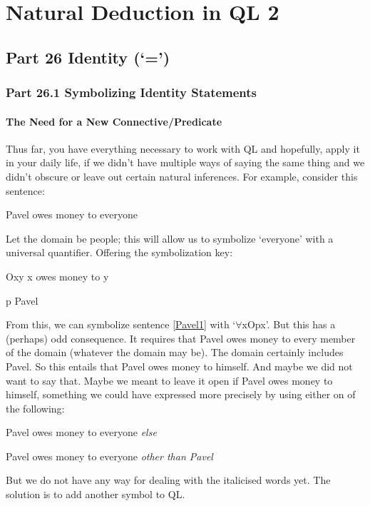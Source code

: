 \part{Natural Deduction in QL 2}
\label{ch.qlnd2}
\chapter{Part 26 Identity (‘=')}
\section{Part 26.1 Symbolizing Identity Statements}
\subsection{The Need for a New Connective/Predicate}

Thus far, you have everything necessary to work with QL and hopefully, apply it in your daily life, if we didn't have multiple ways of saying the same thing and we didn't obscure or leave out certain natural inferences. For example, consider this sentence:
\begin{earg}
\item[\ex{Pavel1}] Pavel owes money to everyone
\end{earg}
Let the domain be people; this will allow us to symbolize ‘everyone’ with a universal quantifier. Offering the symbolization key:
\begin{ekey}
\item[Oxy] x owes money to y
\item[p] Pavel
\end{ekey}
From this, we can symbolize sentence \ref{Pavel1} with ‘$\forall$xOpx’. But this has a (perhaps) odd consequence. It requires that Pavel owes money to every member of the domain (whatever the domain may be). The domain certainly includes Pavel. So this entails that Pavel owes money to himself. And maybe we did not want to say that. Maybe we meant to leave it open if Pavel owes money to himself, something we could have expressed more precisely by using either on of the following:
\begin{earg}
\item[\ex{Pavel2}] Pavel owes money to everyone \emph{else}
\item[\ex{Pavel3}] Pavel owes money to everyone \emph{other than Pavel}
\end{earg}
But we do not have any way for dealing with the italicised words yet. The solution is to add another symbol to QL.
